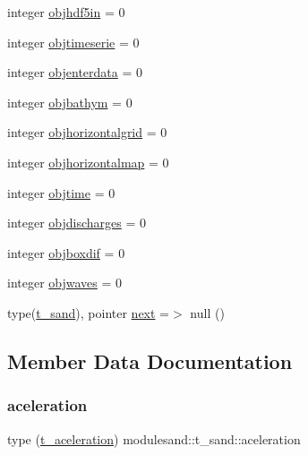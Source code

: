 \begin{DoxyCompactItemize}
\item 
integer \mbox{\hyperlink{structmodulesand_1_1t__sand_aab530b29afeed18f8cc9bdeaed170b47}{objhdf5in}} = 0
\item 
integer \mbox{\hyperlink{structmodulesand_1_1t__sand_a1ad6f26d64bbbd814746c9690871aab8}{objtimeserie}} = 0
\item 
integer \mbox{\hyperlink{structmodulesand_1_1t__sand_ac4712452819ab1a1a9204d4e4608078d}{objenterdata}} = 0
\item 
integer \mbox{\hyperlink{structmodulesand_1_1t__sand_a398346a0c012ada67b3c1f01aa3db567}{objbathym}} = 0
\item 
integer \mbox{\hyperlink{structmodulesand_1_1t__sand_a442e778b6dc392b6ee03bbf913672e64}{objhorizontalgrid}} = 0
\item 
integer \mbox{\hyperlink{structmodulesand_1_1t__sand_a3469c79ec8539806fd3ce4a0a326f6c4}{objhorizontalmap}} = 0
\item 
integer \mbox{\hyperlink{structmodulesand_1_1t__sand_a5360dd654889974e99c9a79bdc493c89}{objtime}} = 0
\item 
integer \mbox{\hyperlink{structmodulesand_1_1t__sand_ad8d8db0145ede4ee048dd0ae2c301a26}{objdischarges}} = 0
\item 
integer \mbox{\hyperlink{structmodulesand_1_1t__sand_a6f9ed769a6661eb03a526e82ca8b432d}{objboxdif}} = 0
\item 
integer \mbox{\hyperlink{structmodulesand_1_1t__sand_aaa5f561e7bbeb7caa00d774eff7c0573}{objwaves}} = 0
\item 
type(\mbox{\hyperlink{structmodulesand_1_1t__sand}{t\+\_\+sand}}), pointer \mbox{\hyperlink{structmodulesand_1_1t__sand_a29033143ecaccb6951dfe2f2caf53102}{next}} =$>$ null ()
\end{DoxyCompactItemize}


\subsection{Member Data Documentation}
\mbox{\label{structmodulesand_1_1t__sand_a846a508ac8380125b523cd195e9ca73c}} 
\subsubsection{\texorpdfstring{aceleration}{aceleration}}
{\footnotesize\ttfamily type (\mbox{\hyperlink{structmodulesand_1_1t__aceleration}{t\+\_\+aceleration}}) modulesand\+::t\+\_\+sand\+::aceleration\hspace{0.3cm}{\ttfamily [private]}}

